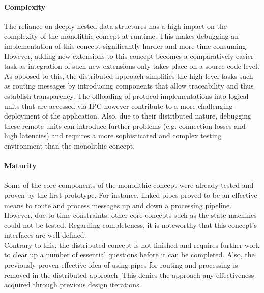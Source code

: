 \paragraph{Complexity}
The reliance on deeply nested data-structures has a high impact on the complexity of the monolithic concept at runtime. This makes debugging an implementation of this concept significantly harder and more time-consuming. However, adding new extensions to this concept becomes a comparatively easier task as integration of such new extensions only takes place on a source-code level.\\
As opposed to this, the distributed approach simplifies the high-level tasks such as routing messages by introducing components that allow traceability and thus establish transparency. The offloading of protocol implementations into logical units that are accessed via \ac{IPC} however contribute to a more challenging deployment of the application. Also, due to their distributed nature, debugging these remote units can introduce further problems (e.g. connection losses and high latencies) and requires a more sophisticated and complex testing environment than the monolithic concept.

\paragraph{Maturity}
Some of the core components of the monolithic concept were already tested and proven by the first prototype. For instance, linked pipes proved to be an effective means to route and process messages up and down a processing pipeline. However, due to time-constraints, other core concepts such as the state-machines could not be tested. Regarding completeness, it is noteworthy that this concept's interfaces are well-defined.\\
Contrary to this, the distributed concept is not finished and requires further work to clear up a number of essential questions before it can be completed. Also, the previously proven effective idea of using pipes for routing and processing is removed in the distributed approach. This denies the approach any effectiveness acquired through previous design iterations.